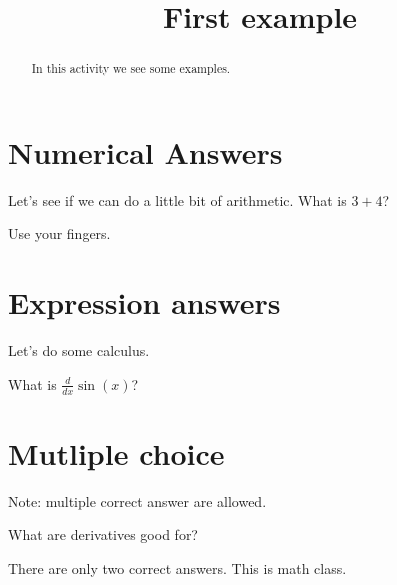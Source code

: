 \documentclass{ximera}
\title{First example}
\begin{document}
\begin{abstract}
In this activity we see some examples.
\end{abstract}
\maketitle

\section{Numerical Answers}

\begin{exercise}
Let's see if we can do a little bit of arithmetic.
What is $3+4$? 

\begin{hint}
Use your fingers.
\end{hint}
\end{exercise}


\section{Expression answers}

\begin{exercise}
Let's do some calculus.

What is $\frac{d}{dx} \sin(x)$?
\end{exercise}


\section{Mutliple choice}

Note: multiple correct answer are allowed.

\begin{question}
What are derivatives good for?
\begin{multipleChoice}
\end{multipleChoice}
\begin{hint}
There are only two correct answers.  This is math class.
\end{hint}
\end{question}
\end{document}
